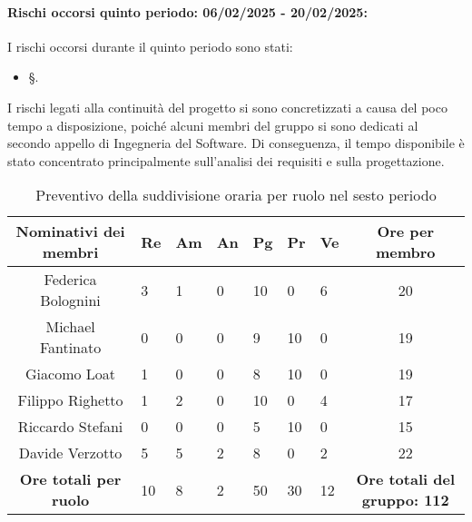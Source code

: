 \paragraph{Rischi occorsi quinto periodo: 06/02/2025 - 20/02/2025: }
I rischi occorsi durante il quinto periodo sono stati:
\begin{itemize}
    \item \S{}.
\end{itemize}
I rischi legati alla continuità del progetto si sono concretizzati a causa del poco tempo a disposizione, poiché alcuni membri del gruppo si sono dedicati al secondo appello di Ingegneria del Software. Di conseguenza, il tempo disponibile è stato concentrato principalmente sull'analisi dei requisiti e sulla progettazione.
\newpage
{}
\begin{table}[h!]
    \centering
    \renewcommand{\arraystretch}{1.5}
    \begin{tabularx}{\textwidth}{|c|X|X|X|X|X|X|c|}\hline
    \rowcolor[HTML]{FFD700} 
    \textbf{Nominativi dei membri} & \textbf{Re} & \textbf{Am} & \textbf{An} & \textbf{Pg} & \textbf{Pr} & \textbf{Ve} & \textbf{Ore per membro} \\ \hline
    Federica Bolognini  & 3 & 1 & 0 & 10 & 0 & 6 & 20 \\ \hline
    Michael Fantinato   & 0 & 0 & 0 & 9 & 10 & 0 & 19 \\ \hline
    Giacomo Loat        & 1 & 0 & 0 & 8 & 10 & 0 & 19 \\ \hline
    Filippo Righetto    & 1 & 2 & 0 & 10 & 0 & 4 & 17 \\ \hline
    Riccardo Stefani    & 0 & 0 & 0 & 5 & 10 & 0 & 15 \\ \hline
    Davide Verzotto     & 5 & 5 & 2 & 8 & 0 & 2 & 22 \\ \hline
    \rowcolor[HTML]{FFD700} 
    \textbf{Ore totali per ruolo} & 10 & 8 & 2 & 50 & 30 & 12 & \textbf{Ore totali del gruppo: 112} \\ \hline
    \end{tabularx}
    \caption{Preventivo della suddivisione oraria per ruolo nel sesto periodo}
\end{table}